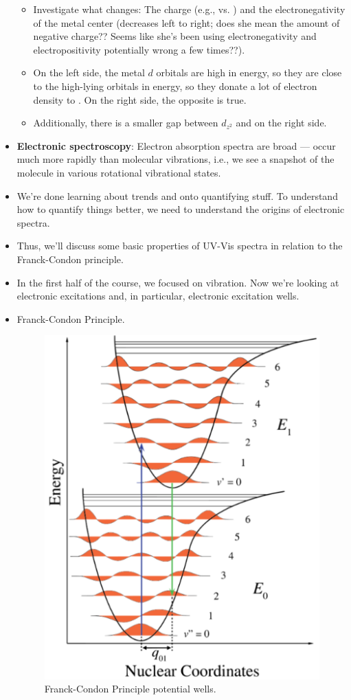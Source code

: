 \documentclass[../notes.tex]{subfiles}
\begin{document}
\begin{itemize}
\begin{itemize}
        \item Investigate what changes: The charge (e.g.,  vs. ) and the electronegativity of the metal center (decreases left to right; does she mean the amount of negative charge?? Seems like she's been using electronegativity and electropositivity potentially wrong a few times??).
        \item On the left side, the metal $d$ orbitals are high in energy, so they are close to the high-lying  orbitals in energy, so they donate a lot of electron density to . On the right side, the opposite is true.
        \item Additionally, there is a smaller gap between $d_{z^2}$ and  on the right side.
    \end{itemize}
    \item \textbf{Electronic spectroscopy}: Electron absorption spectra are broad --- occur much more rapidly than molecular vibrations, i.e., we see a snapshot of the molecule in various rotational vibrational states.
    \item We're done learning about trends and onto quantifying stuff. To understand how to quantify things better, we need to understand the origins of electronic spectra.
    \item Thus, we'll discuss some basic properties of UV-Vis spectra in relation to the Franck-Condon principle.
    \item In the first half of the course, we focused on vibration. Now we're looking at electronic excitations and, in particular, electronic excitation wells.
    \pagebreak
    \item Franck-Condon Principle.
    \begin{figure}[h!]
        \centering
        \includegraphics[width=0.3\linewidth]{../ExtFiles/FC.png}
        \caption{Franck-Condon Principle potential wells.}
        \label{fig:FC}
    \end{figure}
    \begin{itemize}

\end{itemize}
\end{itemize}
\end{document}
